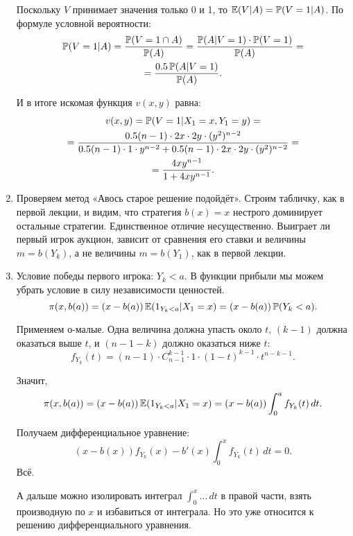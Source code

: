 \begin{enumerate}
Поскольку $ V $ принимает значения только 0 и 1, то $ \E(V|A)=\P(V=1|A) $. По формуле условной вероятности:
\begin{multline}
\P(V=1|A)=\frac{\P(V=1 \cap A)}{\P(A)}=\frac{\P(A|V=1)\cdot \P(V=1)}{\P(A)}=\\
=\frac{0.5\P(A|V=1)}{\P(A)}.
\end{multline}

И в итоге искомая функция $ v(x,y) $ равна:
\begin{multline}
v(x,y)=\P(V=1|X_{1}=x,Y_{1}=y)=\\
=\frac{0.5(n-1)\cdot 2x \cdot 2y\cdot (y^{2})^{n-2}}{0.5(n-1)\cdot 1 \cdot y^{n-2}+0.5(n-1)\cdot 2x \cdot 2y \cdot (y^{2})^{n-2}}=\\
=\frac{4xy^{n-1}}{1+4xy^{n-1}}.
\end{multline}

\item Проверяем метод «Авось старое решение подойдёт». Строим табличку, как в первой лекции, и видим, что стратегия $ b(x)=x $ нестрого доминирует остальные стратегии. Единственное отличие несущественно. Выиграет ли первый игрок аукцион, зависит от сравнения его ставки и величины $m=b(Y_{k}) $, а не величины $m=b(Y_{1}) $, как в первой лекции.


\item Условие победы первого игрока: $ Y_{k}<a $. В функции прибыли мы можем убрать условие в силу независимости ценностей.
\begin{equation}
\pi(x,b(a))=(x-b(a))\E(1_{Y_{k}<a}|X_{1}=x)=(x-b(a))\P(Y_{k}<a).
\end{equation}

Применяем о-малые. Одна величина должна упасть около $ t $, $ (k-1) $ должна оказаться выше $ t $, и $ (n-1-k) $ должно оказаться ниже $ t $:
\begin{equation}
f_{Y_{k}}(t)=(n-1)\cdot C_{n-1}^{k-1}\cdot 1\cdot (1-t)^{k-1}\cdot t^{n-k-1}.
\end{equation}

Значит,
\begin{equation}
\pi(x,b(a))=(x-b(a))\E(1_{Y_{k}<a}|X_{1}=x)=(x-b(a))\int_{0}^{a}f_{Y_{k}}(t) \, dt.
\end{equation}

Получаем дифференциальное уравнение:
\begin{equation}
(x-b(x))f_{Y_{k}}(x)-b'(x)\int_{0}^{x}f_{Y_{k}}(t) \, dt=0.
\end{equation}
Всё.

А дальше можно изолировать интеграл $ \int_{0}^{x}\ldots\, dt $ в правой части, взять производную по $ x $ и избавиться от интеграла. Но это уже относится к решению дифференциального уравнения.



\end{enumerate}
